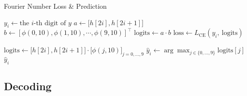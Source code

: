 \ifdefined\isarxiv
\else
\begin{algorithm}[!ht]
\caption{Fourier Number Loss \& Prediction}
\label{alg:fourier_loss_prediction}
\begin{algorithmic}[1]

        \State $y_i \gets \text{the $i$-th digit of } y$
        \State $a \gets \bigl[h[2i],h[2i+1]\bigr]$
        \State $b \gets  [\phi(0,10),
                \phi(1,10),
                \cdots,
                \phi(9,10)]^\top$
        \State $\text{logits} \gets a \cdot b$
        \State $\text{loss} \gets L_{\mathrm{CE}}(y_i,\ \text{logits})$ \State {}
        \State \Return {}
    \EndFunction

    \State   {}
        \State $\text{logits} \gets 
        \bigl[h[2i],h[2i+1]\bigr]
            \cdot
            \bigl[
                \phi(j,10)
            \bigr]_{j=0,\dots,9}$
        \State $\hat{y}_i \gets \arg\max_{j \in \{0,\dots,9\}} \text{logits}[j]$
        \State \Return $\hat{y}_i$
    \EndFunction

\end{algorithmic}
\end{algorithm}

\fi


\subsection{Decoding}\label{sec:fnp}



